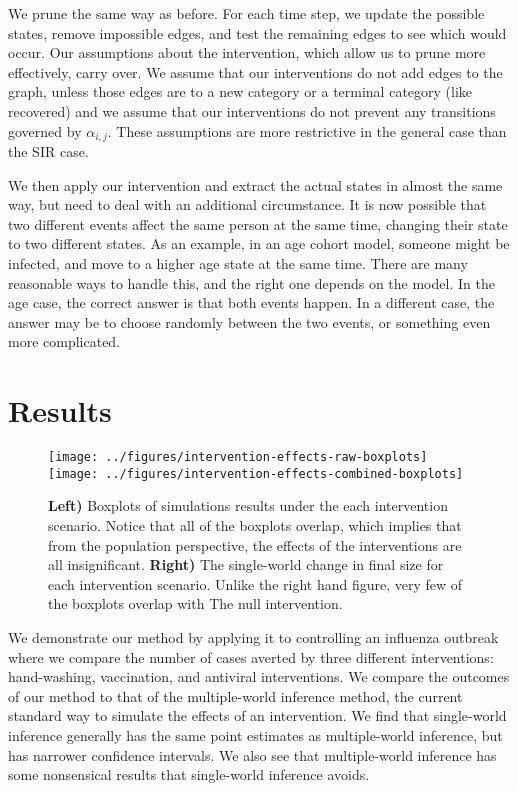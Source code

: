 \documentclass[openacc]{rsproca_new}%
\begin{document}
We prune the same way as before.
For each time step, we update the possible states, remove impossible edges, and test the remaining edges to see which would occur.
Our assumptions about the intervention, which allow us to prune more effectively, carry over.
We assume that our interventions do not add edges to the graph, unless those edges are to a new category or a terminal category (like recovered) and we assume that our interventions do not prevent any transitions governed by $\alpha_{i,j}$.
These assumptions are more restrictive in the general case than the SIR case.

We then apply our intervention and extract the actual states in almost the same way, but need to deal with an additional circumstance.
It is now possible that two different events affect the same person at the same time, changing their state to two different states.
As an example, in an age cohort model, someone might be infected, and move to a higher age state at the same time.
There are many reasonable ways to handle this, and the right one depends on the model.
In the age case, the correct answer is that both events happen.
In a different case, the answer may be to choose randomly between the two events, or something even more complicated.

\section{Results}

\begin{figure}\label{fig:epicurve}
\centering
\texttt{[image: ../figures/intervention-effects-raw-boxplots]}
\texttt{[image: ../figures/intervention-effects-combined-boxplots]}
\caption{\textbf{Left)} Boxplots of simulations results under the each intervention scenario.  Notice that all of the boxplots overlap, which implies that from the population perspective, the effects of the interventions are all insignificant.  \textbf{Right)} The single-world change in final size for each intervention scenario.  Unlike the right hand figure, very few of the boxplots overlap with The null intervention.}
\end{figure}

We demonstrate our method by applying it to controlling an influenza outbreak where we compare the number of cases averted by three different interventions: hand-washing, vaccination, and antiviral interventions.
We compare the outcomes of our method to that of the multiple-world inference method, the current standard way to simulate the effects of an intervention.
We find that single-world inference generally has the same point estimates as multiple-world inference, but has narrower confidence intervals.
We also see that multiple-world inference has some nonsensical results that single-world inference avoids.
\end{document}
